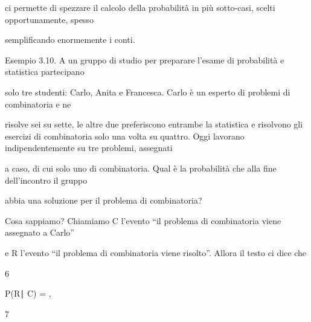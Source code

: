 \documentclass[a4paper,portrait,12pt]{article}
\begin{document}
\begin{flushleft}
ci permette di spezzare il calcolo della probabilit\`{a} in più sotto-casi, scelti opportunamente, spesso
\end{flushleft}


\begin{flushleft}
semplificando enormemente i conti.
\end{flushleft}





\begin{flushleft}
Esempio 3.10. A un gruppo di studio per preparare l'esame di probabilit\`{a} e statistica partecipano
\end{flushleft}


\begin{flushleft}
solo tre studenti: Carlo, Anita e Francesca. Carlo \`{e} un esperto di problemi di combinatoria e ne
\end{flushleft}


\begin{flushleft}
risolve sei su sette, le altre due preferiscono entrambe la statistica e risolvono gli esercizi di combinatoria solo una volta su quattro. Oggi lavorano indipendentemente su tre problemi, assegnati
\end{flushleft}


\begin{flushleft}
a caso, di cui solo uno di combinatoria. Qual \`{e} la probabilit\`{a} che alla fine dell'incontro il gruppo
\end{flushleft}


\begin{flushleft}
abbia una soluzione per il problema di combinatoria?
\end{flushleft}


\begin{flushleft}
Cosa sappiamo? Chiamiamo C l'evento ``il problema di combinatoria viene assegnato a Carlo''
\end{flushleft}


\begin{flushleft}
e R l'evento ``il problema di combinatoria viene risolto''. Allora il testo ci dice che
\end{flushleft}


6


\begin{flushleft}
P(R∣ C) = ,
\end{flushleft}


7
\end{document}
